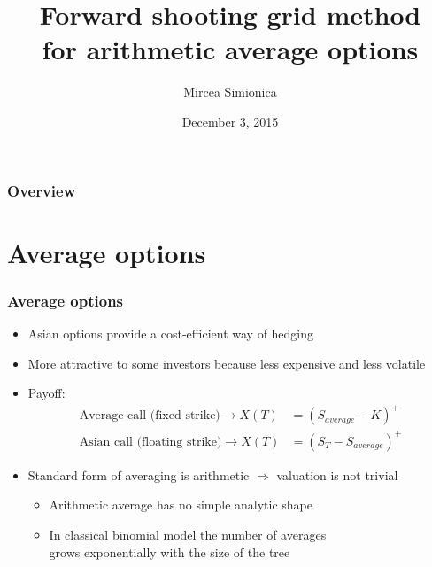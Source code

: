 \documentclass{beamer}
\title[Forward shooting grid]{Forward shooting grid method \\ for arithmetic average options} %
\author{Mircea Simionica} %
\institute[] %
{
\medskip
\textit{Applied Numerical Finance assignment} %
}
\date{December 3, 2015} %
\begin{document}
\begin{frame}
\titlepage %
\end{frame}


\begin{frame}
\frametitle{Overview} %
\tableofcontents %
\end{frame}

\section{Average options} %
\begin{frame}
\frametitle{Average options}
\begin{itemize}
\item Asian options provide a cost-efficient way of hedging
\item More attractive to some investors because less expensive and less volatile
\item Payoff:
\begin{align*}
\text{Average call (fixed strike)} \rightarrow X(T) &= (S_{average}-K)^+ \\
\text{Asian call (floating strike)} \rightarrow X(T) &= (S_T - S_{average})^+
\end{align*}
\item Standard form of averaging is arithmetic $\Rightarrow$ valuation is not trivial
\begin{itemize}
\item Arithmetic average has no simple analytic shape
\item In classical binomial model the number of averages \\ grows exponentially with the size of the tree
\end{itemize}
\end{itemize}

\end{frame}
\end{document}
